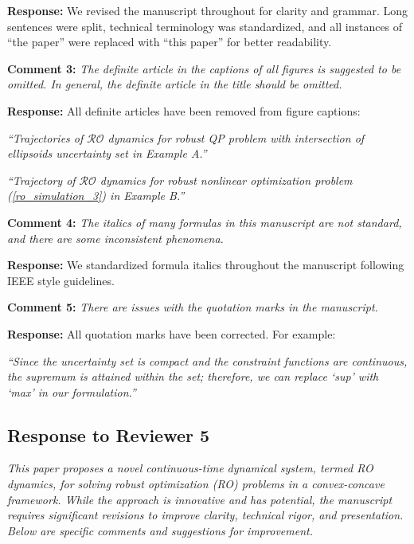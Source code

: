 \documentclass[journal,twoside,web]{ieeecolor}
\begin{document}
\noindent\textbf{Response:} We revised the manuscript throughout for clarity and grammar. Long sentences were split, technical terminology was standardized, and all instances of ``the paper'' were replaced with ``this paper'' for better readability.

\vspace{0.5em}
\noindent\textbf{Comment 3:} \textit{The definite article in the captions of all figures is suggested to be omitted. In general, the definite article in the title should be omitted.}

\noindent\textbf{Response:} All definite articles have been removed from figure captions: 

{\color{revisionblue}\textit{``Trajectories of $\mathcal{RO}$ dynamics for robust QP problem with intersection of ellipsoids uncertainty set in Example A.''}}

{\color{revisionblue}\textit{``Trajectory of $\mathcal{RO}$ dynamics for robust nonlinear optimization problem (\ref{ro_simulation_3}) in Example B.''}}

\vspace{0.5em}
\noindent\textbf{Comment 4:} \textit{The italics of many formulas in this manuscript are not standard, and there are some inconsistent phenomena.}

\noindent\textbf{Response:} We standardized formula italics throughout the manuscript following IEEE style guidelines.

\vspace{0.5em}
\noindent\textbf{Comment 5:} \textit{There are issues with the quotation marks in the manuscript.}

\noindent\textbf{Response:} All quotation marks have been corrected. For example:

{\color{revisionblue}\textit{``Since the uncertainty set is compact and the constraint functions are continuous, the supremum is attained within the set; therefore, we can replace `sup' with `max' in our formulation.''}}

\newpage
\subsection*{Response to Reviewer 5}

\noindent\textit{This paper proposes a novel continuous-time dynamical system, termed RO dynamics, for solving robust optimization (RO) problems in a convex-concave framework. While the approach is innovative and has potential, the manuscript requires significant revisions to improve clarity, technical rigor, and presentation. Below are specific comments and suggestions for improvement.}
\end{document}
